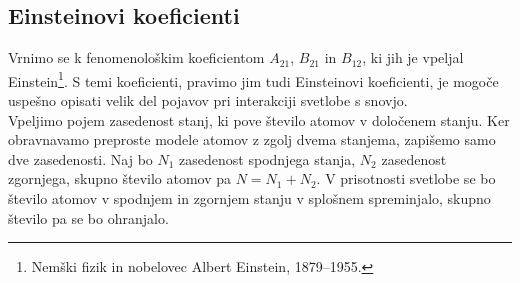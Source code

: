 \subsection*{Einsteinovi koeficienti}
\label{AB}
Vrnimo se k fenomenološkim koeficientom $A_{21}$, $B_{21}$ in $B_{12}$, ki jih je 
vpeljal Einstein\footnote{Nemški fizik in nobelovec Albert Einstein, 1879--1955.}. 
S temi koeficienti, pravimo jim tudi Einsteinovi koeficienti, 
je mogoče uspešno opisati velik del pojavov pri interakciji svetlobe s snovjo.\\

\noindent
Vpeljimo pojem zasedenost stanj, ki pove število 
atomov v določenem stanju. Ker obravnavamo preproste modele atomov z zgolj 
dvema stanjema, zapišemo samo dve zasedenosti. Naj bo $N_1$ zasedenost 
spodnjega stanja, $N_{2}$ zasedenost zgornjega, skupno število atomov pa
$N=N_1+N_2$. V prisotnosti svetlobe 
se bo število atomov v spodnjem in zgornjem stanju v splošnem spreminjalo, skupno 
število pa se bo ohranjalo.\\

